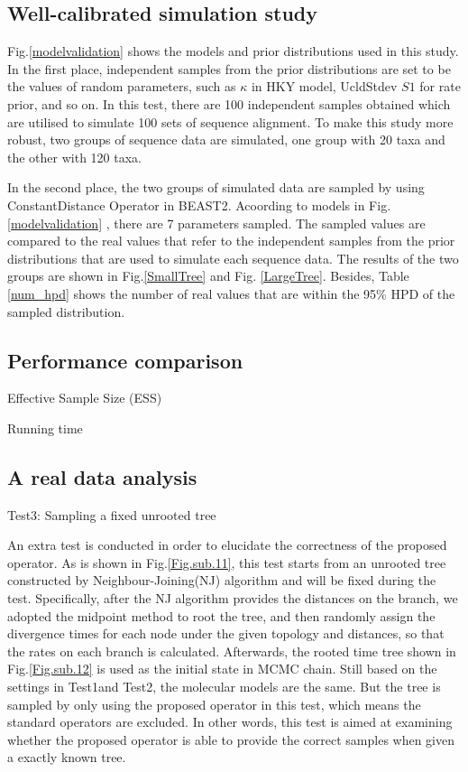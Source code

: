 \documentclass{bmcart}
\begin{document}
\subsection*{Well-calibrated simulation study}
Fig.\ref{modelvalidation} shows the models and prior distributions used in this study. In the first place, independent samples from the prior distributions are set to be the values of random parameters, such as $\kappa$ in HKY model, UcldStdev $S1$ for rate prior, and so on. In this test, there are 100 independent samples obtained which are utilised to simulate 100 sets of sequence alignment. To make this study more robust, two groups of sequence data are simulated, one group with 20 taxa and the other with 120 taxa. 

In the second place, the two groups of simulated data are sampled by using ConstantDistance Operator in BEAST2. Acoording to models in Fig.\ref{modelvalidation} , there are 7 parameters sampled. The sampled values are compared to the real values that refer to the independent samples from the prior distributions that are used to simulate each sequence data. The results of the two groups are shown in Fig.\ref{SmallTree} and Fig.
\ref{LargeTree}. Besides, Table \ref{num_hpd} shows the number of real values that are within the 95\% HPD of the sampled distribution. 
\subsection*{Performance comparison}
Effective Sample Size (ESS)

Running time
\subsection*{A real data analysis}

\begin{description}
\item[Test3: Sampling a fixed unrooted tree] 
\end{description}
An extra test is conducted in order to elucidate the correctness of the proposed operator. As is shown in Fig.\ref{Fig.sub.11}, this test starts from an unrooted tree constructed by Neighbour-Joining(NJ) algorithm and will be fixed during the test. Specifically, after the NJ algorithm provides the distances on the branch, we adopted the midpoint method to root the tree, and then randomly assign the divergence times for each node under the given topology and distances, so that the rates on each branch is calculated. Afterwards, the rooted time tree shown in Fig.\ref{Fig.sub.12}  is used as the initial state in MCMC chain. Still based on the settings in Test1and Test2, the molecular models are the same. But the tree is sampled by only using the proposed operator in this test, which means the standard operators are excluded. In other words, this test is aimed at examining whether the proposed operator is able to provide the correct samples when given a exactly known tree.
\end{document}
